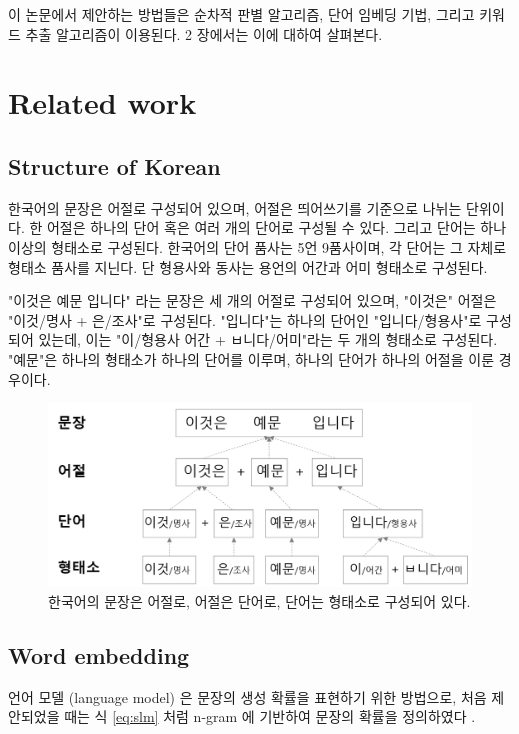 \documentclass[11pt]{article}
\begin{document}
이 논문에서 제안하는 방법들은 순차적 판별 알고리즘, 단어 임베딩 기법, 그리고 키워드 추출 알고리즘이 이용된다.
2 장에서는 이에 대하여 살펴본다.

\section{Related work}

\subsection{Structure of Korean}

한국어의 문장은 어절로 구성되어 있으며, 어절은 띄어쓰기를 기준으로 나뉘는 단위이다.
한 어절은 하나의 단어 혹은 여러 개의 단어로 구성될 수 있다.
그리고 단어는 하나 이상의 형태소로 구성된다.
한국어의 단어 품사는 5언 9품사이며, 각 단어는 그 자체로 형태소 품사를 지닌다.
단 형용사와 동사는 용언의 어간과 어미 형태소로 구성된다.

"이것은 예문 입니다" 라는 문장은 세 개의 어절로 구성되어 있으며, "이것은" 어절은 "이것/명사 + 은/조사"로 구성된다.
"입니다"는 하나의 단어인 "입니다/형용사"로 구성되어 있는데, 이는 "이/형용사 어간 + ㅂ니다/어미"라는 두 개의 형태소로 구성된다.
"예문"은 하나의 형태소가 하나의 단어를 이루며, 하나의 단어가 하나의 어절을 이룬 경우이다.

\begin{figure}[H]
\centering
\includegraphics[keepaspectratio=true, width=0.8\linewidth]{figures/korean_structure.png}
\caption{한국어의 문장은 어절로, 어절은 단어로, 단어는 형태소로 구성되어 있다.}
\label{fig:korean_structure}
\end{figure}

\subsection{Word embedding}

언어 모델 (language model) 은 문장의 생성 확률을 표현하기 위한 방법으로, 처음 제안되었을 때는 식 \ref{eq:slm} 처럼 n-gram 에 기반하여 문장의 확률을 정의하였다 \citep{jurafsky2014speech}.
\end{document}
